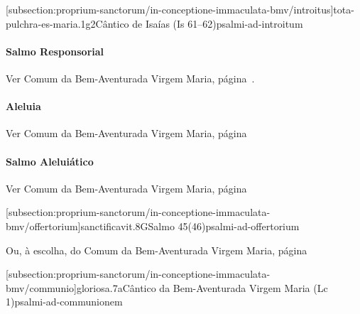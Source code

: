 \def\Prefix{subsection:proprium-sanctorum/in-conceptione-immaculata-bmv}

[\Prefix/introitus]{tota-pulchra-es-maria.1g2}{Cântico de Isaías (Is 61--62)}{psalmi-ad-introitum}

\paragraph{Salmo Responsorial}
\begin{rubrica}
  Ver Comum da Bem-Aventurada Virgem Maria, página~\pageref{subsection:communia/commune-bmv/psalmus-responsorius}.
\end{rubrica}

\paragraph{Aleluia}
\begin{rubrica}
  Ver Comum da Bem-Aventurada Virgem Maria, página~\pageref{subsection:communia/commune-bmv/alleluia}
\end{rubrica}

\paragraph{Salmo Aleluiático}
\begin{rubrica}
  Ver Comum da Bem-Aventurada Virgem Maria, página~\pageref{subsection:communia/commune-bmv/psalmus-alleluiaticus}
\end{rubrica}

\AllowPageFlush

[\Prefix/offertorium]{sanctificavit.8G}{Salmo 45(46)}{psalmi-ad-offertorium}

\begin{rubrica}
  Ou, à escolha, do Comum da Bem-Aventurada Virgem Maria, página~\pageref{subsection:communia/commune-bmv/offertorium}
\end{rubrica}

\AllowPageFlush

[\Prefix/communio]{gloriosa.7a}{Cântico da Bem-Aventurada Virgem Maria (Lc 1)}{psalmi-ad-communionem}
